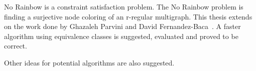 No Rainbow is a constraint satisfaction problem.
The No Rainbow problem is finding a surjective node coloring of an r-regular multigraph.
This thesis extends on the work done by Ghazaleh Parvini and David Fernandez-Baca~\cite{sourceNoRainbow}.
A faster algorithm using equivalence classes is suggested, evaluated and proved to be correct.

Other ideas for potential algorithms are also suggested.

